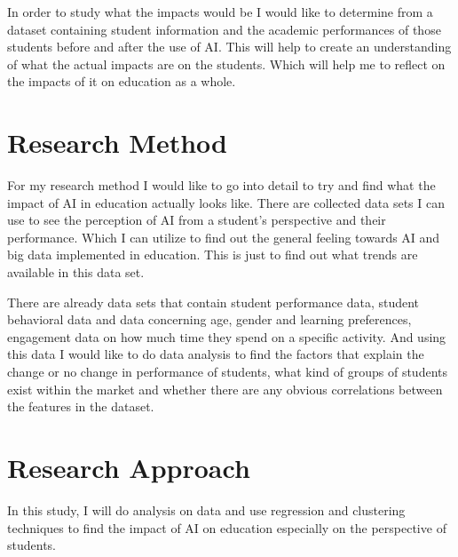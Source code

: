 \documentclass{imc-inf}
\begin{document}
In order to study what the impacts would be I would like to determine from a dataset containing student information and the academic performances of those students before and after the use of AI. This will help to create an understanding of what the actual impacts are on the students. Which will help me to reflect on the impacts of it on education as a whole. 



\section{Research Method }
For my research method I would like to go into detail to try and find what the impact of AI in education actually looks like. There are collected data sets I can use to see the perception of AI from a student’s perspective and their performance. Which I can utilize to find out the general feeling towards AI and big data implemented in education. This is just to find out what trends are available in this data set. 

There are already data sets that contain student performance data, student behavioral data and data concerning age, gender and learning preferences, engagement data on how much time they spend on a specific activity. And using this data I would like to do data analysis to find the factors that explain the change or no change in performance of students, what kind of groups of students exist within the market and whether there are any obvious correlations between the features in the dataset. 





\section{Research Approach }
In this study, I will do analysis on data and use regression and clustering techniques to find the impact of AI on education especially on the perspective of students. 
\end{document}
